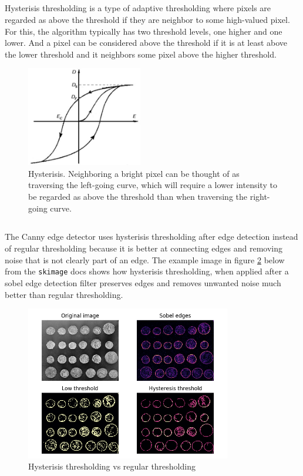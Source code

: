\documentclass[]{article}
\begin{document}
\subsection{}
Hysterisis thresholding is a type of adaptive thresholding where pixels are regarded as above the threshold if they are neighbor to some high-valued pixel. For this, the algorithm typically has two threshold levels, one higher and one lower. And a pixel can be considered above the threshold if it is at least above the lower threshold and it neighbors some pixel above the higher threshold.
\begin{figure}[H]
\centering
\includegraphics[width=0.45\textwidth]{img/hysterisis}
\caption{Hysterisis. Neighboring a bright pixel can be thought of as traversing the left-going curve, which will require a lower intensity to be regarded as above the threshold than when traversing the right-going curve.}
\label{fig:hysterisis}
\end{figure}

\subsection{}
The Canny edge detector uses hysterisis thresholding after edge detection instead of regular thresholding because it is better at connecting edges and removing noise that is not clearly part of an edge. The example image in figure \ref{fig:hysterisis_skimage} below from the \texttt{skimage} docs shows how hysterisis thresholding, when applied after a sobel edge detection filter preserves edges and removes unwanted noise much better than regular thresholding.

\begin{figure}[H]
\centering
\includegraphics[width=0.8\textwidth]{img/hysterisis_skimage}
\caption{Hysterisis thresholding vs regular thresholding}
\label{fig:hysterisis_skimage}
\end{figure}
\end{document}
